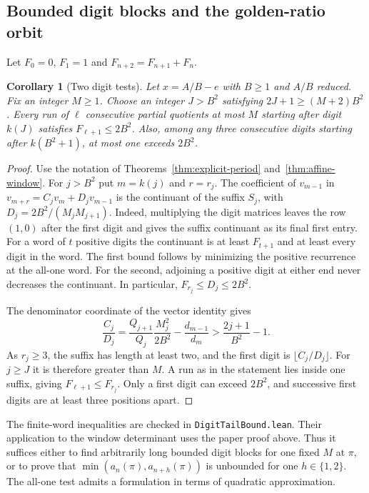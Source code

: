 \documentclass[11pt]{amsart}
\newtheorem{corollary}[theorem]{Corollary}
\theoremstyle{definition}
\theoremstyle{remark}
\numberwithin{equation}{section}
\begin{document}
\subsection{Bounded digit blocks and the golden-ratio orbit}
Let $F_0=0$, $F_1=1$ and $F_{n+2}=F_{n+1}+F_n$.
\begin{corollary}[Two digit tests]\label{cor:bounded-digit-block}
Let $x=A/B-e$ with $B\ge1$ and $A/B$ reduced. Fix an integer $M\ge1$.
Choose an integer $J>B^2$ satisfying $2J+1\ge(M+2)B^2$.
Every run of $\ell$ consecutive partial quotients at most $M$ starting
after digit $k(J)$ satisfies $F_{\ell+1}\le2B^2$. Also, among any three
consecutive digits starting after $k(B^2+1)$, at most one exceeds $2B^2$.
\end{corollary}
\begin{proof}
Use the notation of Theorems~\ref{thm:explicit-period}
and~\ref{thm:affine-window}. For $j>B^2$ put $m=k(j)$ and $r=r_j$.
The coefficient of $v_{m-1}$ in $v_{m+r}=C_jv_m+D_jv_{m-1}$ is
the continuant of the suffix $S_j$, with $D_j=2B^2/(M_jM_{j+1})$.
Indeed, multiplying the digit matrices leaves the row $(1,0)$ after
the first digit and gives the suffix continuant as its final first entry.
For a word of $t$ positive digits the continuant is at least $F_{t+1}$
and at least every digit in the word. The first bound follows by
minimizing the positive recurrence at the all-one word. For the second,
adjoining a positive digit at either end never decreases the continuant.
In particular, $F_{r_j}\le D_j\le2B^2$.

The denominator coordinate of the vector identity gives
\[
 \frac{C_j}{D_j}
 =\frac{Q_{j+1}}{Q_j}\frac{M_j^2}{2B^2}-\frac{d_{m-1}}{d_m}
 >\frac{2j+1}{B^2}-1 .
\]
As $r_j\ge3$, the suffix has length at least two, and the first digit
is $\lfloor C_j/D_j\rfloor$. For $j\ge J$ it is therefore greater than $M$.
A run as in the statement lies inside one suffix, giving
$F_{\ell+1}\le F_{r_j}$. Only a first digit can exceed $2B^2$, and
successive first digits are at least three positions apart.
\end{proof}
The finite-word inequalities are checked in \texttt{DigitTailBound.lean}.
Their application to the window determinant uses the paper proof above.
Thus it suffices either to find arbitrarily long bounded digit blocks
for one fixed $M$ at $\pi$, or to prove that
$\min(a_n(\pi),a_{n+h}(\pi))$ is unbounded for one $h\in\{1,2\}$.
The all-one test admits a formulation in terms of quadratic approximation.
\end{document}
